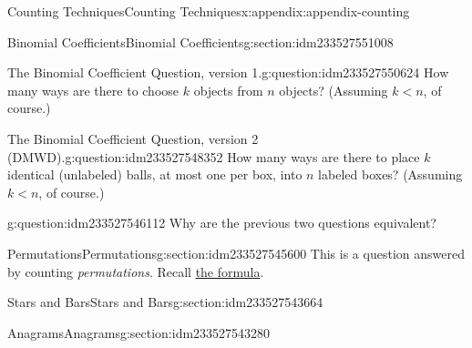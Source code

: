 \documentclass[oneside,10pt,]{book}
\numberwithin{equation}{section}
\newcommand{\lt}{<}
\begin{document}
\begin{appendixptx}{Counting Techniques}{}{Counting Techniques}{}{}{x:appendix:appendix-counting}
\begin{sectionptx}{Binomial Coefficients}{}{Binomial Coefficients}{}{}{g:section:idm233527551008}
\begin{question}{The Binomial Coefficient Question, version 1.}{g:question:idm233527550624}
How many ways are there to choose \(k\) objects from \(n\) objects? (Assuming \(k \lt n\), of course.)%
\end{question}
\begin{question}{The Binomial Coefficient Question, version 2 (DMWD).}{g:question:idm233527548352}%
How many ways are there to place \(k\) identical (unlabeled) balls, at most one per box, into \(n\) labeled boxes? (Assuming \(k \lt n\), of course.)%
\end{question}
\begin{question}{}{g:question:idm233527546112}%
Why are the previous two questions equivalent?%
\end{question}
\end{sectionptx}
%
%
\typeout{************************************************}
\typeout{************************************************}
%
\begin{sectionptx}{Permutations}{}{Permutations}{}{}{g:section:idm233527545600}
This is a question answered by counting \emph{permutations}. Recall \hyperref[x:assemblage:formula-permutations]{the formula}.%
\end{sectionptx}
%
%
\typeout{************************************************}
\typeout{************************************************}
%
\begin{sectionptx}{Stars and Bars}{}{Stars and Bars}{}{}{g:section:idm233527543664}
\end{sectionptx}
%
%
\typeout{************************************************}
\typeout{************************************************}
%
\begin{sectionptx}{Anagrams}{}{Anagrams}{}{}{g:section:idm233527543280}
\end{sectionptx}
\end{appendixptx}
%
\backmatter
%
\end{document}
